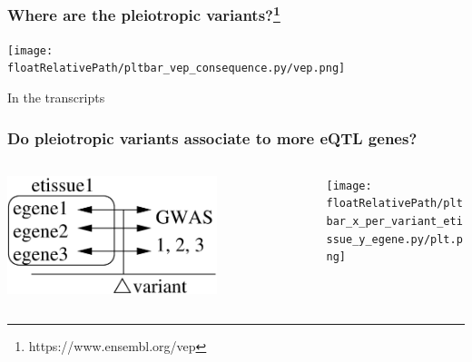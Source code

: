 \documentclass{beamer}
\newcommand*{\floatRelativePath}{../out/gwas417/pval_5e-08/r2_0.1/kb_1000/window_1000000/75_50}%
\begin{document}
        \begin{frame}
            \frametitle{Where are the pleiotropic variants?\footnote{https://www.ensembl.org/vep}}

            \begin{center}
                \texttt{[image: \\floatRelativePath/pltbar\_vep\_consequence.py/vep.png]}
            \end{center}

            In the transcripts


        \end{frame}

        \begin{frame}
            \frametitle{Do pleiotropic variants associate to more eQTL genes?}

            \begin{columns}
                \begin{column}{0.5\textwidth}
                    \begin{center}
                        \includegraphics[width=0.7\textwidth]{../presentation_230120_gold2022_paris/fig/model_pleio_egenes.png}
                    \end{center}
                \end{column}
                \begin{column}{0.5\textwidth}  %
                    \begin{center}
                        \texttt{[image: \\floatRelativePath/pltbar\_x\_per\_variant\_etissue\_y\_egene.py/plt.png]}
                    \end{center}
                \end{column}
            \end{columns}

        \end{frame}
\end{document}

